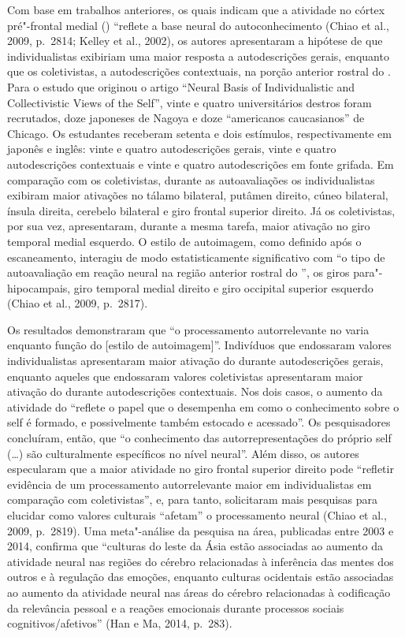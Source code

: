 Com base em trabalhos anteriores, os quais indicam que a atividade no
córtex pré"-frontal medial () ``reflete a base neural do
autoconhecimento (Chiao et al., 2009, p.~2814; Kelley et al., 2002), os
autores apresentaram a hipótese de que individualistas exibiriam uma
maior resposta a autodescrições gerais, enquanto que os coletivistas, a
autodescrições contextuais, na porção anterior rostral do . Para o
estudo que originou o artigo ``Neural Basis of Individualistic and
Collectivistic Views of the Self'', vinte e quatro universitários
destros foram recrutados, doze japoneses de Nagoya e doze ``americanos
caucasianos'' de Chicago. Os estudantes receberam setenta e dois
estímulos, respectivamente em japonês e inglês: vinte e quatro
autodescrições gerais, vinte e quatro autodescrições contextuais e vinte
e quatro autodescrições em fonte grifada. Em comparação com os
coletivistas, durante as autoavaliações os individualistas exibiram
maior ativações no tálamo bilateral, putâmen direito, cúneo bilateral,
ínsula direita, cerebelo bilateral e giro frontal superior direito. Já
os coletivistas, por sua vez, apresentaram, durante a mesma tarefa,
maior ativação no giro temporal medial esquerdo. O estilo de
autoimagem, como definido após o escaneamento, interagiu de modo
estatisticamente significativo com ``o tipo de autoavaliação em reação
neural na região anterior rostral do '', os giros para"-hipocampais,
giro temporal medial direito e giro occipital superior esquerdo (Chiao
et al., 2009, p.~2817).

Os resultados demonstraram que ``o processamento autorrelevante no 
varia enquanto função do {[}estilo de autoimagem{]}''. Indivíduos que
endossaram valores individualistas apresentaram maior ativação do 
durante autodescrições gerais, enquanto aqueles que endossaram valores
coletivistas apresentaram maior ativação do  durante autodescrições
contextuais. Nos dois casos, o aumento da atividade do  ``reflete o
papel que o  desempenha em como o conhecimento sobre o self é
formado, e possivelmente também estocado e acessado''. Os pesquisadores
concluíram, então, que ``o conhecimento das autorrepresentações do
próprio self (\ldots{}) são culturalmente específicos no nível neural''. Além
disso, os autores especularam que a maior atividade no giro frontal
superior direito pode ``refletir evidência de um processamento
autorrelevante maior em individualistas em comparação com
coletivistas'', e, para tanto, solicitaram mais pesquisas para elucidar
como valores culturais ``afetam'' o processamento neural (Chiao et al.,
2009, p.~2819). Uma meta"-análise da pesquisa na área, publicadas entre
2003 e 2014, confirma que ``culturas do leste da Ásia estão associadas
ao aumento da atividade neural nas regiões do cérebro relacionadas à
inferência das mentes dos outros e à regulação das emoções, enquanto
culturas ocidentais estão associadas ao aumento da atividade neural nas
áreas do cérebro relacionadas à codificação da relevância pessoal e a
reações emocionais durante processos sociais cognitivos/afetivos'' (Han
e Ma, 2014, p.~283).

